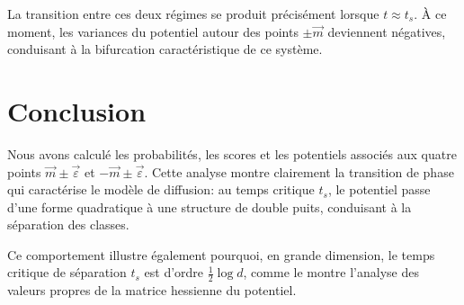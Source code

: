 \documentclass[11pt,a4paper]{article}
\begin{document}
La transition entre ces deux régimes se produit précisément lorsque $t \approx t_s$. À ce moment, les variances du potentiel autour des points $\pm \vec{m}$ deviennent négatives, conduisant à la bifurcation caractéristique de ce système.

\section{Conclusion}

Nous avons calculé les probabilités, les scores et les potentiels associés aux quatre points $\vec{m} \pm \vec{\varepsilon}$ et $-\vec{m} \pm \vec{\varepsilon}$. Cette analyse montre clairement la transition de phase qui caractérise le modèle de diffusion: au temps critique $t_s$, le potentiel passe d'une forme quadratique à une structure de double puits, conduisant à la séparation des classes.

Ce comportement illustre également pourquoi, en grande dimension, le temps critique de séparation $t_s$ est d'ordre $\frac{1}{2}\log d$, comme le montre l'analyse des valeurs propres de la matrice hessienne du potentiel.
\end{document}
